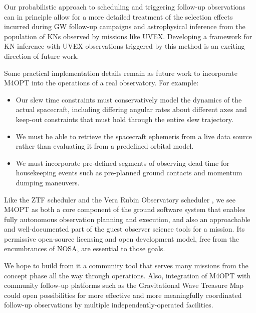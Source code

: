 \documentclass[twocolumn,times]{aastex631}
\begin{document}
Our probabilistic approach to scheduling and triggering follow-up observations can in principle allow for a more detailed treatment of the selection effects incurred during \ac{GW} follow-up campaigns and astrophysical inference from the population of \acp{KN} observed by missions like \ac{UVEX}. Developing a framework for \ac{KN} inference with \ac{UVEX} observations triggered by this method is an exciting direction of future work.

Some practical implementation details remain as future work to incorporate \ac{M4OPT} into the operations of a real observatory. For example:
%
\begin{itemize}
\item Our slew time constraints must conservatively model the dynamics of the actual spacecraft, including differing angular rates about different axes and keep-out constraints that must hold through the entire slew trajectory.
\item We must be able to retrieve the spacecraft ephemeris from a live data source rather than evaluating it from a predefined orbital model.
\item We must incorporate pre-defined segments of observing dead time for housekeeping events such as pre-planned ground contacts and momentum dumping maneuvers.
\end{itemize}

Like the \ac{ZTF} scheduler \citep{2019PASP..131f8003B} and the Vera Rubin Observatory scheduler \citep{2019AJ....157..151N}, we see \ac{M4OPT} as both a core component of the ground software system that enables fully autonomous observation planning and execution, and also an approachable and well-documented part of the guest observer science tools for a mission. Its permissive open-source licensing and open development model, free from the encumbrances of \ac{NOSA}, are essential to those goals.

We hope to build from it a community tool that serves many missions from the concept phase all the way through operations. Also, integration of \ac{M4OPT} with community follow-up platforms such as the Gravitational Wave Treasure Map \citep{2020ApJ...894..127W} could open possibilities for more effective and more meaningfully coordinated follow-up observations by multiple independently-operated facilities.
\end{document}
